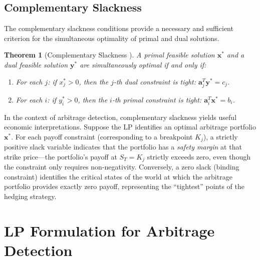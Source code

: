 \documentclass[openany]{book}
\numberwithin{figure}{chapter}
\numberwithin{equation}{chapter}
\newtheorem{theorem}{Theorem}[chapter]
\begin{document}
\subsection{Complementary Slackness}

The complementary slackness conditions provide a necessary and sufficient criterion for the simultaneous optimality of primal and dual solutions.

\begin{theorem}[Complementary Slackness {\cite{bertsimas1997}}]
\label{thm:comp_slack}
A primal feasible solution $\mathbf{x}^*$ and a dual feasible solution $\mathbf{y}^*$ are simultaneously optimal if and only if:
\begin{enumerate}
    \item For each $j$: if $x_j^* > 0$, then the $j$-th dual constraint is tight: $\mathbf{a}_j^T \mathbf{y}^* = c_j$.
    \item For each $i$: if $y_i^* > 0$, then the $i$-th primal constraint is tight: $\mathbf{a}_i^T \mathbf{x}^* = b_i$.
\end{enumerate}
\end{theorem}

In the context of arbitrage detection, complementary slackness yields useful economic interpretations. Suppose the LP identifies an optimal arbitrage portfolio $\mathbf{x}^*$. For each payoff constraint (corresponding to a breakpoint $K_j$), a strictly positive slack variable indicates that the portfolio has a \textit{safety margin} at that strike price---the portfolio's payoff at $S_T = K_j$ strictly exceeds zero, even though the constraint only requires non-negativity. Conversely, a zero slack (binding constraint) identifies the critical states of the world at which the arbitrage portfolio provides exactly zero payoff, representing the ``tightest'' points of the hedging strategy.


\section{LP Formulation for Arbitrage Detection}
\end{document}
